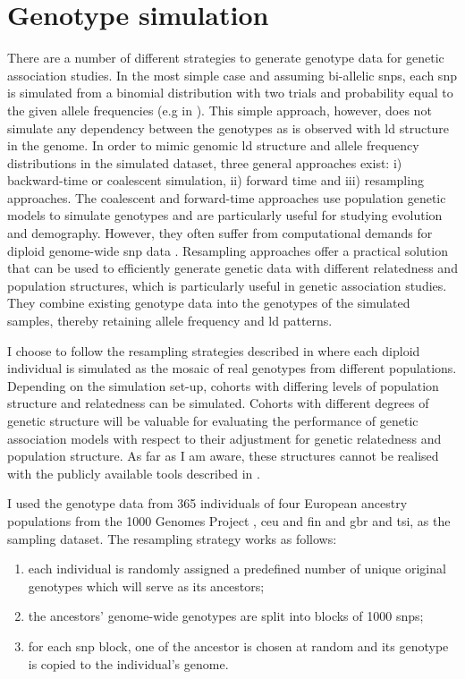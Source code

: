 \section{Genotype simulation}
\label{section:genotype-simulation}
There are a number of different strategies to generate genotype data for genetic association studies. In the most simple case and assuming bi-allelic \glspl{snp}, each \gls{snp} is simulated from a binomial distribution with two trials and probability equal to the given allele frequencies  (e.g in \citep{Lippert2013}). This simple approach, however, does not simulate any dependency between the genotypes as is observed with \gls{ld} structure in the genome. In order to mimic genomic \gls{ld} structure and allele frequency distributions in the simulated dataset, three general approaches exist: i) backward-time or coalescent simulation, ii) forward time and iii) resampling approaches. The coalescent \citep{Hudson2002,Ewing2010,Kelleher2016} and forward-time approaches \citep{Peng2007,Hoggart2007,Carvajal-Rodriguez2008} use population genetic models to simulate genotypes and are particularly useful for studying evolution and demography. However, they often suffer from computational demands for diploid genome-wide \gls{snp} data \citep{Liu2008,Yuan2012}. Resampling approaches \citep{Wright2007,Su2011,Loh2014,Casale2015} offer a practical solution that can be used to efficiently generate genetic data with different relatedness and population structures, which is particularly useful in genetic association studies. They combine existing genotype data into the genotypes of the simulated samples, thereby retaining allele frequency and \gls{ld} patterns. 

I choose to follow the resampling strategies described in \citep{Loh2014,Casale2015} where each diploid individual is simulated as the mosaic of real genotypes from different populations.  Depending on the simulation set-up, cohorts with differing levels of population structure and relatedness can be simulated. Cohorts with different degrees of genetic structure will be valuable for evaluating the performance of genetic association models with respect to their adjustment for genetic relatedness and population structure.  As far as I am aware, these structures cannot be realised with the publicly available tools described in \citep{Wright2007,Su2011}.

I used the genotype data from \num{365} individuals of four European ancestry populations from the 1000 Genomes Project \citep{1000Genomes2015}, \gls{ceu} and \gls{fin} and  \gls{gbr} and \gls{tsi}, as the sampling dataset.  The resampling strategy works as follows:
\begin{enumerate}
\item each individual is randomly assigned a predefined number of unique original genotypes which will serve as its ancestors;
\item the ancestors' genome-wide genotypes are split into blocks of \num{1000} \glspl{snp};
\item  for each \gls{snp} block, one of the ancestor is chosen at random and its genotype is copied to the individual's genome. 
\end{enumerate}

